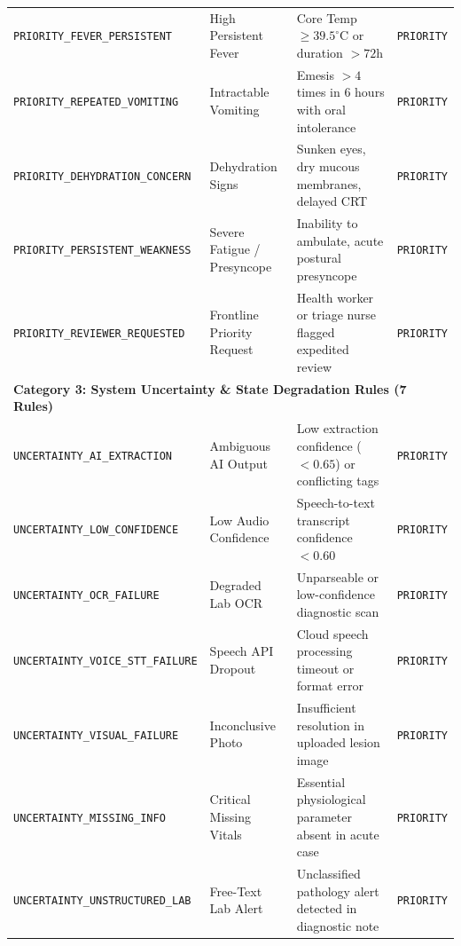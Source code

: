 \documentclass[11pt,a4paper,oneside]{report}
\begin{document}
\begin{longtable}{lp{3.4cm}p{4.6cm}c}
  \midrule
  \texttt{PRIORITY\_FEVER\_PERSISTENT} & High Persistent Fever & Core Temp $\ge 39.5^\circ\text{C}$ or duration $> 72\text{h}$ & \texttt{PRIORITY} \\
  \texttt{PRIORITY\_REPEATED\_VOMITING} & Intractable Vomiting & Emesis $> 4$ times in 6 hours with oral intolerance & \texttt{PRIORITY} \\
  \texttt{PRIORITY\_DEHYDRATION\_CONCERN} & Dehydration Signs & Sunken eyes, dry mucous membranes, delayed CRT & \texttt{PRIORITY} \\
  \texttt{PRIORITY\_PERSISTENT\_WEAKNESS} & Severe Fatigue / Presyncope & Inability to ambulate, acute postural presyncope & \texttt{PRIORITY} \\
  \texttt{PRIORITY\_REVIEWER\_REQUESTED} & Frontline Priority Request & Health worker or triage nurse flagged expedited review & \texttt{PRIORITY} \\
  \midrule
  \multicolumn{4}{l}{\textbf{Category 3: System Uncertainty \& State Degradation Rules (7 Rules)}} \\
  \midrule
  \texttt{UNCERTAINTY\_AI\_EXTRACTION} & Ambiguous AI Output & Low extraction confidence ($< 0.65$) or conflicting tags & \texttt{PRIORITY} \\
  \texttt{UNCERTAINTY\_LOW\_CONFIDENCE} & Low Audio Confidence & Speech-to-text transcript confidence $< 0.60$ & \texttt{PRIORITY} \\
  \texttt{UNCERTAINTY\_OCR\_FAILURE} & Degraded Lab OCR & Unparseable or low-confidence diagnostic scan & \texttt{PRIORITY} \\
  \texttt{UNCERTAINTY\_VOICE\_STT\_FAILURE} & Speech API Dropout & Cloud speech processing timeout or format error & \texttt{PRIORITY} \\
  \texttt{UNCERTAINTY\_VISUAL\_FAILURE} & Inconclusive Photo & Insufficient resolution in uploaded lesion image & \texttt{PRIORITY} \\
  \texttt{UNCERTAINTY\_MISSING\_INFO} & Critical Missing Vitals & Essential physiological parameter absent in acute case & \texttt{PRIORITY} \\
  \texttt{UNCERTAINTY\_UNSTRUCTURED\_LAB} & Free-Text Lab Alert & Unclassified pathology alert detected in diagnostic note & \texttt{PRIORITY} \\
\end{longtable}

\end{document}
